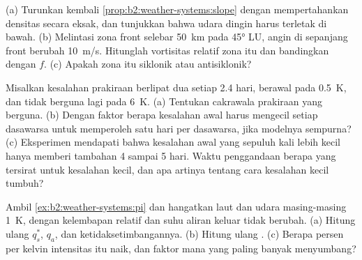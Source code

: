 \begin{exercise}[$\star\star\star$]\label{exo:b2:weather-systems:10}
(a) Turunkan kembali \cref{prop:b2:weather-systems:slope} dengan mempertahankan densitas secara eksak, dan tunjukkan bahwa
udara dingin harus terletak di bawah. (b) Melintasi zona front selebar \qty{50}{km} pada \ang{45} LU, angin
di sepanjang front berubah \qty{10}{m/s}. Hitunglah vortisitas relatif zona itu dan bandingkan
dengan $f$. (c) Apakah zona itu siklonik atau antisiklonik?
\end{exercise}

\begin{exercise}[$\star\star\star$]\label{exo:b2:weather-systems:11}
Misalkan kesalahan prakiraan berlipat dua setiap 2.4 hari, berawal pada \qty{0.5}{K}, dan tidak berguna lagi pada
\qty{6}{K}. (a) Tentukan cakrawala prakiraan yang berguna. (b) Dengan faktor berapa kesalahan awal harus
mengecil setiap dasawarsa untuk memperoleh satu hari per dasawarsa, jika modelnya sempurna? (c) Eksperimen mendapati bahwa
kesalahan awal yang sepuluh kali lebih kecil hanya memberi tambahan 4 sampai 5 hari. Waktu penggandaan berapa yang tersirat untuk
kesalahan kecil, dan apa artinya tentang cara kesalahan kecil tumbuh?
\end{exercise}

\begin{exercise}[$\star\star\star$]\label{exo:b2:weather-systems:12}
Ambil \cref{ex:b2:weather-systems:pi} dan hangatkan laut dan udara masing-masing \qty{1}{K}, dengan
kelembapan relatif dan suhu aliran keluar tidak berubah. (a) Hitung ulang $q_s^*$, $q_a$, dan
ketidaksetimbangannya. (b) Hitung ulang . (c) Berapa persen per kelvin
intensitas itu naik, dan faktor mana yang paling banyak menyumbang?
\end{exercise}


